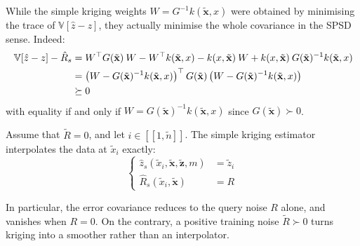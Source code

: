 \begin{remark}
	While the simple kriging weights $W=G^{-1}k(\tilde{\mathbf{x}},x)$ were obtained by minimising the trace of $\mathbb{V}[\hat{z}-z]$, they actually minimise the whole covariance in the SPSD sense. Indeed:
	\begin{equation}
		\begin{aligned}
		\mathbb{V}[\hat{z}-z]-\hat{R}_s&=W^\top G(\tilde{\mathbf{x}})\:W-W^\top k(\tilde{\mathbf{x}},x)-k(x,\tilde{\mathbf{x}})\:W+k(x,\tilde{\mathbf{x}})\:G(\tilde{\mathbf{x}})^{-1}k(\tilde{\mathbf{x}},x)\hspace{-1mm}\\
		&=\left(W-G(\tilde{\mathbf{x}})^{-1}k(\tilde{\mathbf{x}},x)\right)^\top G(\tilde{\mathbf{x}})\left(W-G(\tilde{\mathbf{x}})^{-1}k(\tilde{\mathbf{x}},x)\right)\\
		&\succeq0
		\end{aligned}
	\end{equation}
	with equality if and only if $W=G(\tilde{\mathbf{x}})^{-1}k(\tilde{\mathbf{x}},x)$ since $G(\tilde{\mathbf{x}})\succ0$.
\end{remark}

\begin{proposition}
	Assume that $\tilde{R}=0$, and let $i\in[\![1,\tilde{n}]\!]$. The simple kriging estimator interpolates the data at $\tilde{x}_i$ exactly:
	\begin{equation}
		\left\{\begin{aligned}
		\hat{z}_s(\tilde{x}_i,\tilde{\mathbf{x}},\tilde{\mathbf{z}},m)&=\tilde{z}_i\\
		\hat{R}_s(\tilde{x}_i,\tilde{\mathbf{x}})&=R
		\end{aligned}\right.
	\end{equation}

	In particular, the error covariance reduces to the query noise $R$ alone, and vanishes when $R=0$. On the contrary, a positive training noise $\tilde{R}\succ0$ turns kriging into a smoother rather than an interpolator.
\end{proposition}

